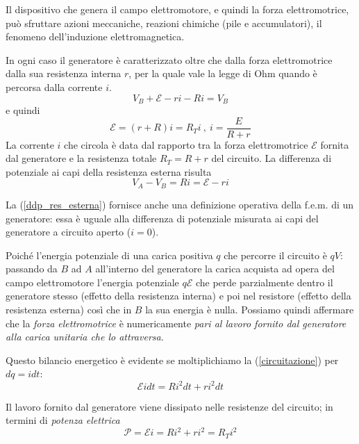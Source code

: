 \documentclass[class=book, crop=false, oneside, 12pt]{standalone}
\begin{document}
Il dispositivo che genera il campo elettromotore, e quindi la forza elettromotrice, può sfruttare azioni meccaniche, reazioni chimiche (pile e accumulatori), il fenomeno dell'induzione elettromagnetica.

In ogni caso il generatore è caratterizzato oltre che dalla forza elettromotrice dalla sua resistenza interna \(r\), per la quale vale la legge di Ohm quando è percorsa dalla corrente \(i\).
\begin{equation*}
    V_B + \mathcal{E} - ri - Ri = V_B
\end{equation*}
e quindi
\begin{equation} \label{circuitazione}
    \mathcal{E} = \left(r + R\right) i  = R_T i \ , \ i = \frac{E}{R + r}
\end{equation}
La corrente \(i\) che circola è data dal rapporto tra la forza elettromotrice \(\mathcal{E}\) fornita dal generatore e la resistenza totale \(R_T = R + r\) del circuito. 
La differenza di potenziale ai capi della resistenza esterna risulta
\begin{equation} \label{ddp_res_esterna}
    V_A - V_B = R i = \mathcal{E} - ri
\end{equation}

La (\ref{ddp_res_esterna}) fornisce anche una definizione operativa della f.e.m. di un generatore: essa è uguale alla differenza di potenziale misurata ai capi del generatore a  circuito aperto (\(i = 0\)). 

Poiché l'energia potenziale di una carica positiva \(q\) che percorre il circuito è \(qV\): passando da \(B\) ad \(A\) all'interno del generatore la carica acquista ad opera del campo elettromotore l'energia potenziale \(q\mathcal{E}\) che perde parzialmente dentro il generatore stesso (effetto della resistenza interna) e poi nel resistore (effetto della resistenza esterna) così che in \(B\) la sua energia è nulla. 
Possiamo quindi affermare che la \emph{forza elettromotrice} è numericamente \emph{pari al lavoro fornito dal generatore alla carica unitaria che lo attraversa}. 

Questo bilancio energetico è evidente se moltiplichiamo la (\ref{circuitazione}) per \(dq = i dt\): 
\begin{equation*}
    \mathcal{E} i dt = Ri^2 dt + r i^2 dt
\end{equation*}

Il lavoro fornito dal generatore viene dissipato nelle resistenze del circuito; in termini di \emph{potenza elettrica}
\begin{equation}
    \mathcal{P} = \mathcal{E} i = R i^2 + r i^2 = R_T i^2
\end{equation}
\end{document}
